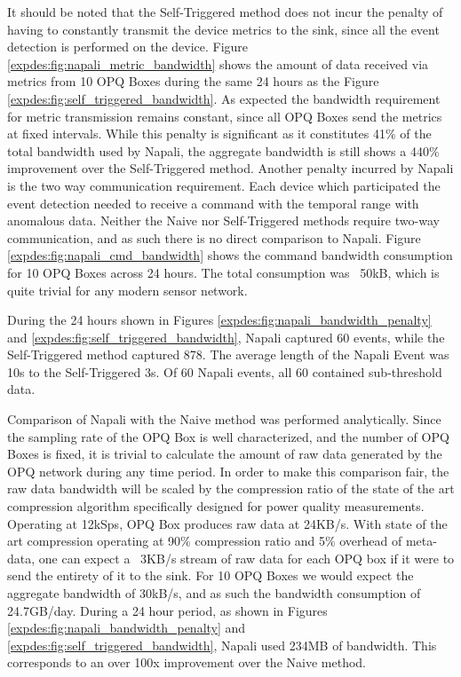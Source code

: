 It should be noted that the Self-Triggered method does not incur the penalty of having to constantly transmit the device metrics to the sink, since all the event detection is performed on the device.
Figure \ref{expdes:fig:napali_metric_bandwidth} shows the amount of data received via metrics from 10 OPQ Boxes during the same 24 hours as the Figure \ref{expdes:fig:self_triggered_bandwidth}.
As expected the bandwidth requirement for metric transmission remains constant, since all OPQ Boxes send the metrics at fixed intervals.
While this penalty is significant as it constitutes 41\% of the total bandwidth used by Napali, the aggregate bandwidth is still shows a 440\% improvement over the Self-Triggered method.
Another penalty incurred by Napali is the two way communication requirement.
Each device which participated the event detection needed to receive a command with the temporal range with anomalous data.
Neither the Naive nor Self-Triggered methods require two-way communication, and as such there is no direct comparison to Napali.
Figure \ref{expdes:fig:napali_cmd_bandwidth} shows the command bandwidth consumption for 10 OPQ Boxes across 24 hours.
The total consumption was ~50kB, which is quite trivial for any modern sensor network.

During the 24 hours shown in Figures \ref{expdes:fig:napali_bandwidth_penalty} and \ref{expdes:fig:self_triggered_bandwidth}, Napali captured 60 events, while the Self-Triggered method captured 878.
The average length of the Napali Event was 10s to the Self-Triggered 3s.
Of 60 Napali events, all 60 contained sub-threshold data.

Comparison of Napali with the Naive method was performed analytically.
Since the sampling rate of the OPQ Box is well characterized, and the number of OPQ Boxes is fixed, it is trivial to calculate the amount of raw data generated by the OPQ network during any time period.
In order to make this comparison fair, the raw data bandwidth will be scaled by the compression ratio of the state of the art compression algorithm specifically designed for power quality measurements.\cite{zhang2009new}
Operating at 12kSps, OPQ Box produces raw data at 24KB/s.
With state of the art compression operating at 90\% compression ratio and 5\% overhead of meta-data, one can expect a ~3KB/s stream of raw data for each OPQ box if it were to send the entirety of it to the sink.
For 10 OPQ Boxes we would expect the aggregate bandwidth of 30kB/s, and as such the bandwidth consumption of 24.7GB/day.
During a 24 hour period, as shown in Figures \ref{expdes:fig:napali_bandwidth_penalty} and \ref{expdes:fig:self_triggered_bandwidth}, Napali used 234MB of bandwidth.
This corresponds to an over 100x improvement over the Naive method.

